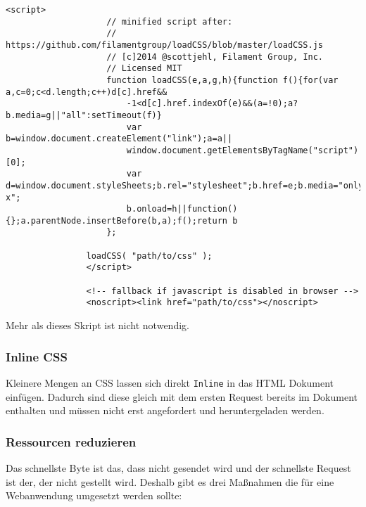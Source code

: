 				\begin{lstlisting}[captionpos=b, caption=load a CSS file asynchronously, label=lst:deferCSS, breaklines=false]
				<script>
					// minified script after: 
					// https://github.com/filamentgroup/loadCSS/blob/master/loadCSS.js
					// [c]2014 @scottjehl, Filament Group, Inc.
					// Licensed MIT
		 			function loadCSS(e,a,g,h){function f(){for(var a,c=0;c<d.length;c++)d[c].href&&
		 				-1<d[c].href.indexOf(e)&&(a=!0);a?b.media=g||"all":setTimeout(f)}
		 				var b=window.document.createElement("link");a=a||
		 				window.document.getElementsByTagName("script")[0];
		 				var d=window.document.styleSheets;b.rel="stylesheet";b.href=e;b.media="only x";
		 				b.onload=h||function(){};a.parentNode.insertBefore(b,a);f();return b
		 			};

		  		loadCSS( "path/to/css" );
				</script>

				<!-- fallback if javascript is disabled in browser -->
				<noscript><link href="path/to/css"></noscript>
				\end{lstlisting}

				Mehr als dieses Skript ist nicht notwendig.
					

			\subsubsection{Inline CSS} %
			\label{ssub:inline_css}
				Kleinere Mengen an CSS lassen sich direkt \texttt{Inline} in das HTML Dokument einfügen. Dadurch sind diese gleich mit dem ersten Request bereits im Dokument enthalten und müssen nicht erst angefordert und heruntergeladen werden.

			\subsubsection{Ressourcen reduzieren} %
			\label{ssub:ressourcen_reduzieren}
				Das schnellste Byte ist das, dass nicht gesendet wird und der schnellste Request ist der, der nicht gestellt wird. Deshalb gibt es drei Maßnahmen die für eine Webanwendung umgesetzt werden sollte:

